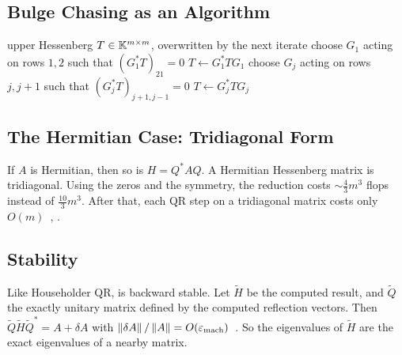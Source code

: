 \subsection{Bulge Chasing as an Algorithm}

\begin{algorithm}[H]
  \caption{One step of the QR iteration on an upper Hessenberg matrix by bulge chasing.}
  \label{alg:bulge-chasing}
  \begin{algorithmic}[1]
    \Require upper Hessenberg $T \in \mathbb{K}^{m \times m}$, overwritten by the next iterate
    \State choose $G_1$ acting on rows $1, 2$ such that $(G_1^\ast T)_{21} = 0$
    \State $T \gets G_1^\ast TG_1$ 
      \State choose $G_j$ acting on rows $j, j+1$ such that $(G_j^\ast T)_{j+1,j-1} = 0$ 
      \State $T \gets G_j^\ast TG_j$ 
    \EndFor
  \end{algorithmic}
\end{algorithm}

\subsection{The Hermitian Case: Tridiagonal Form}

If $A$ is Hermitian, then so is $H = Q^\ast AQ$. A Hermitian Hessenberg matrix is tridiagonal. Using the zeros and the symmetry, the reduction costs $\sim\tfrac{4}{3}m^3$ flops instead of $\tfrac{10}{3}m^3$. After that, each QR step on a tridiagonal matrix costs only $O(m)$~\cite[Lecture 26]{TB}, \cite[Section 4.4.7]{Demmel}.

\subsection{Stability}

Like Householder QR,  is backward stable. Let $\tilde{H}$ be the computed result, and $\tilde{Q}$ the exactly unitary matrix defined by the computed reflection vectors. Then $\tilde{Q}\tilde{H}\tilde{Q}^\ast = A + \delta A$ with $\left\lVert \delta A \right\rVert/\left\lVert A \right\rVert = O(\varepsilon_{\mathrm{mach}})$~\cite[Theorem 26.1]{TB}. So the eigenvalues of $\tilde{H}$ are the exact eigenvalues of a nearby matrix.
